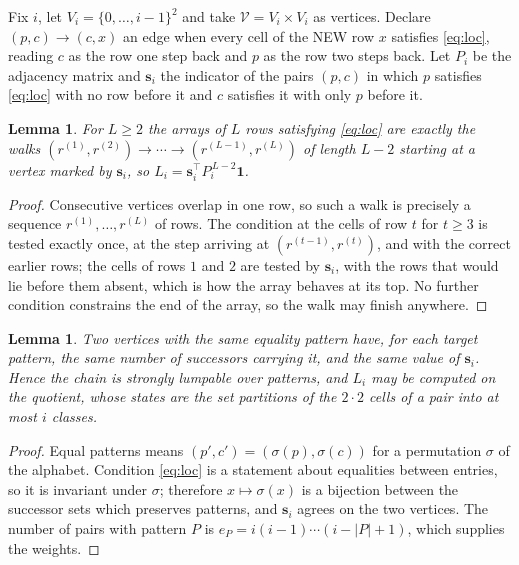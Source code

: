 \documentclass[11pt,a4paper]{article}
\theoremstyle{plain}
\newtheorem{lemma}[theorem]{Lemma}
\theoremstyle{definition}
\begin{document}
Fix $i$, let $V_i=\{0,\dots,i-1\}^{2}$ and take $\mathcal V=V_i\times V_i$ as vertices.
Declare $(p,c)\to(c,x)$ an edge when every cell of the NEW row $x$ satisfies
\eqref{eq:loc}, reading $c$ as the row one step back and $p$ as the row two steps
back. Let $P_i$ be the adjacency matrix and $\mathbf{s}_i$ the indicator of the pairs
$(p,c)$ in which $p$ satisfies \eqref{eq:loc} with no row before it and $c$ satisfies it
with only $p$ before it.

\begin{lemma}\label{lem:walk}
For $L\ge2$ the arrays of $L$ rows satisfying \eqref{eq:loc} are exactly the walks
$(r^{(1)},r^{(2)})\to\cdots\to(r^{(L-1)},r^{(L)})$ of length $L-2$ starting at a
vertex marked by $\mathbf{s}_i$, so
$L_i=\mathbf{s}_i^{\!\top}P_i^{\,L-2}\mathbf{1}$.
\end{lemma}

\begin{proof}
Consecutive vertices overlap in one row, so such a walk is precisely a sequence
$r^{(1)},\dots,r^{(L)}$ of rows. The condition at the cells of row $t$ for $t\ge3$
is tested exactly once, at the step arriving at $(r^{(t-1)},r^{(t)})$, and with the
correct earlier rows; the cells of rows $1$ and $2$ are tested by $\mathbf{s}_i$, with
the rows that would lie before them absent, which is how the array behaves at its top. No
further condition constrains the end of the array, so the walk may finish anywhere.
\end{proof}

\begin{lemma}\label{lem:lump}
Two vertices with the same equality pattern have, for each target pattern, the same number of
successors carrying it, and the same value of $\mathbf{s}_i$. Hence the chain is strongly
lumpable over patterns, and $L_i$ may be computed on the quotient, whose states are the set
partitions of the $2\cdot2$ cells of a pair into at most $i$ classes.
\end{lemma}

\begin{proof}
Equal patterns means $(p',c')=(\sigma(p),\sigma(c))$ for a permutation $\sigma$ of the
alphabet. Condition \eqref{eq:loc} is a statement about equalities between entries, so it is
invariant under $\sigma$; therefore $x\mapsto\sigma(x)$ is a bijection between the successor
sets which preserves patterns, and $\mathbf{s}_i$ agrees on the two vertices. The number of
pairs with pattern $P$ is $e_P=i(i-1)\cdots(i-|P|+1)$, which supplies the weights.
\end{proof}
\end{document}
